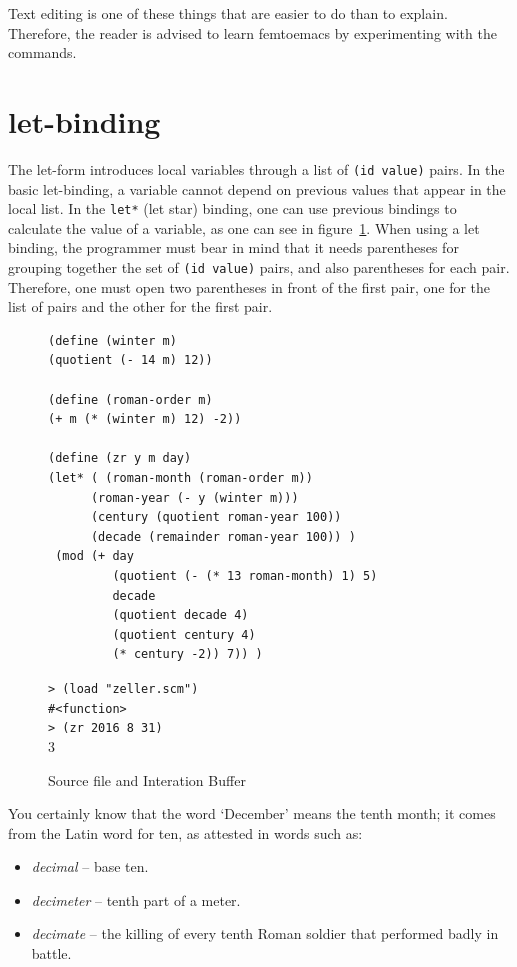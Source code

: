 \documentclass[a4paper,12pt]{book}
\newenvironment{fmpage}[1]
           {\begin{lrbox}{\fmbox}\begin{minipage}{#1}}
           {\end{minipage}\end{lrbox}\fbox{\usebox{\fmbox}}}
\begin{document}
Text editing is one of these things that
are easier to do than to explain. Therefore,
the reader is advised to learn femtoemacs
by experimenting with the commands.

\section{let-binding}
The let-form introduces 
local variables
through a list of \verb|(id value)| 
pairs.
In the basic let-binding, a variable cannot 
depend on previous values that appear
in the local list. In the
\verb|let*| (let star) binding,
one can use previous bindings to calculate
the value of a variable, as one can see in
figure~\ref{fig:date-calculation}.
When using a let binding, the programmer must
bear in mind that it needs parentheses for
grouping together the set of \verb|(id value)| pairs,
and also parentheses for each pair. Therefore,
one must open two parentheses in front of the
first pair, one for the list of pairs and the
other for the first pair.


\begin{figure}[!b]
\begin{fmpage}{0.9\linewidth}
\begin{verbatim}
(define (winter m)
(quotient (- 14 m) 12))

(define (roman-order m)
(+ m (* (winter m) 12) -2))

(define (zr y m day)
(let* ( (roman-month (roman-order m))
      (roman-year (- y (winter m)))
      (century (quotient roman-year 100))
      (decade (remainder roman-year 100)) )
 (mod (+ day
         (quotient (- (* 13 roman-month) 1) 5)
         decade
         (quotient decade 4)
         (quotient century 4)
         (* century -2)) 7)) )
\end{verbatim}
\end{fmpage}

\begin{fmpage}{0.9\linewidth}
\verb|> (load "zeller.scm")|\\
\verb|#<function>|\\
\verb|> (zr 2016 8 31)|\\
3
\end{fmpage}
\caption{Source file and Interation Buffer}
\label{fig:date-calculation}
\end{figure}

You certainly know that the word `December' means
the tenth month; it comes from the Latin word for
ten, as attested in words such as:
\begin{itemize}
\item {\em decimal} -- base ten.
\item {\em decimeter} -- tenth part of a meter.
\item {\em decimate} -- the killing of every tenth
Roman soldier that performed badly in battle.
\end{itemize}
\end{document}
